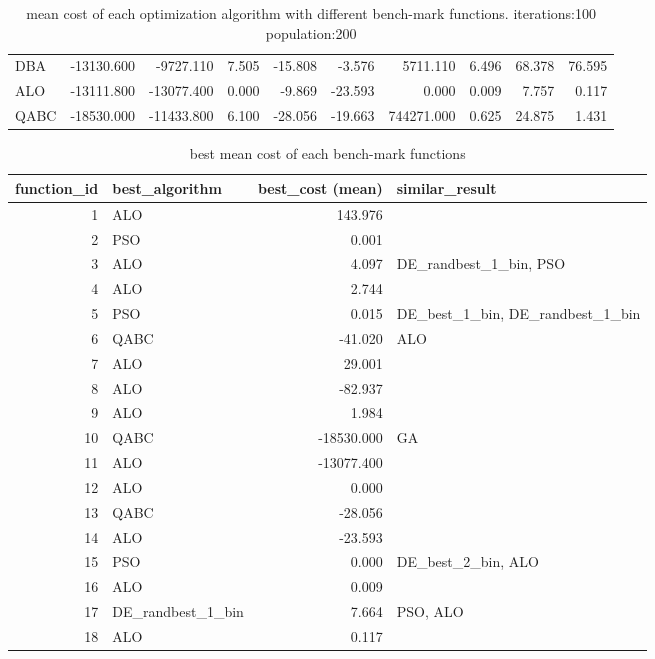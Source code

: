 \documentclass[12pt]{article}
\begin{document}
\begin{table}[H]
\begin{adjustbox}{width=1\textwidth}
\begin{tabular}{lrrrrrrrrr}
               DBA & -13130.600 &  -9727.110 &  7.505 & -15.808 &  -3.576 &     5711.110 &   6.496 &   68.378 &  76.595 \\
               ALO & -13111.800 & -13077.400 &  0.000 &  -9.869 & -23.593 &        0.000 &   0.009 &    7.757 &   0.117 \\
              QABC & -18530.000 & -11433.800 &  6.100 & -28.056 & -19.663 &   744271.000 &   0.625 &   24.875 &   1.431 \\
\bottomrule
\end{tabular}

\end{adjustbox}
\caption{mean cost of each optimization algorithm with different bench-mark functions. iterations:100 population:200} 
\label{tab:summary}
\end{table}



\begin{table}[H]
    \centering
    \scriptsize
\begin{tabular}{rlrl}
\toprule
 function\_id &     best\_algorithm &  best\_cost (mean) &                    similar\_result \\
\midrule
 1 &  ALO & 143.976 &   \\
 2 &  PSO & 0.001 &   \\
 3 &  ALO & 4.097 &  DE\_randbest\_1\_bin, PSO \\
 4 &  ALO & 2.744 &   \\
 5 &  PSO & 0.015 &  DE\_best\_1\_bin, DE\_randbest\_1\_bin \\
 6 &  QABC & -41.020 &  ALO \\
 7 &  ALO & 29.001 &   \\
 8 &  ALO & -82.937 &   \\
 9 &  ALO & 1.984 &   \\
 10 &  QABC & -18530.000 &  GA \\
 11 &  ALO & -13077.400 &   \\
 12 &  ALO & 0.000 &   \\
 13 &  QABC & -28.056 &   \\
 14 &  ALO & -23.593 &   \\
 15 &  PSO & 0.000 &  DE\_best\_2\_bin, ALO \\
 16 &  ALO & 0.009 &   \\
 17 &  DE\_randbest\_1\_bin & 7.664 &  PSO, ALO \\
 18 &  ALO & 0.117 &   \\
\bottomrule
\end{tabular}

    \caption{best mean cost of each bench-mark functions} 
    \label{tab:summary_best}
\end{table}
\end{document}
